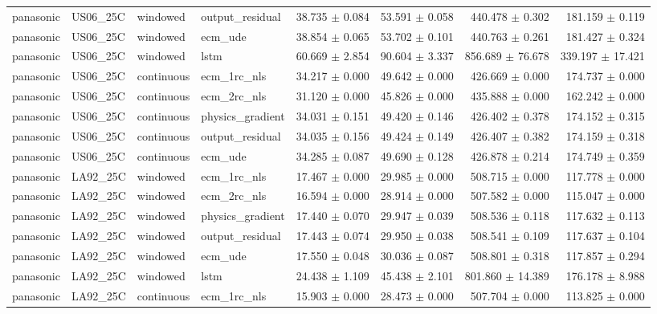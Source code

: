\begin{longtable}{llllrrrr}
panasonic & US06\_25C & windowed & output\_residual & 38.735 $\pm$ 0.084 & 53.591 $\pm$ 0.058 & 440.478 $\pm$ 0.302 & 181.159 $\pm$ 0.119 \\
panasonic & US06\_25C & windowed & ecm\_ude & 38.854 $\pm$ 0.065 & 53.702 $\pm$ 0.101 & 440.763 $\pm$ 0.261 & 181.427 $\pm$ 0.324 \\
panasonic & US06\_25C & windowed & lstm & 60.669 $\pm$ 2.854 & 90.604 $\pm$ 3.337 & 856.689 $\pm$ 76.678 & 339.197 $\pm$ 17.421 \\
panasonic & US06\_25C & continuous & ecm\_1rc\_nls & 34.217 $\pm$ 0.000 & 49.642 $\pm$ 0.000 & 426.669 $\pm$ 0.000 & 174.737 $\pm$ 0.000 \\
panasonic & US06\_25C & continuous & ecm\_2rc\_nls & 31.120 $\pm$ 0.000 & 45.826 $\pm$ 0.000 & 435.888 $\pm$ 0.000 & 162.242 $\pm$ 0.000 \\
panasonic & US06\_25C & continuous & physics\_gradient & 34.031 $\pm$ 0.151 & 49.420 $\pm$ 0.146 & 426.402 $\pm$ 0.378 & 174.152 $\pm$ 0.315 \\
panasonic & US06\_25C & continuous & output\_residual & 34.035 $\pm$ 0.156 & 49.424 $\pm$ 0.149 & 426.407 $\pm$ 0.382 & 174.159 $\pm$ 0.318 \\
panasonic & US06\_25C & continuous & ecm\_ude & 34.285 $\pm$ 0.087 & 49.690 $\pm$ 0.128 & 426.878 $\pm$ 0.214 & 174.749 $\pm$ 0.359 \\
panasonic & LA92\_25C & windowed & ecm\_1rc\_nls & 17.467 $\pm$ 0.000 & 29.985 $\pm$ 0.000 & 508.715 $\pm$ 0.000 & 117.778 $\pm$ 0.000 \\
panasonic & LA92\_25C & windowed & ecm\_2rc\_nls & 16.594 $\pm$ 0.000 & 28.914 $\pm$ 0.000 & 507.582 $\pm$ 0.000 & 115.047 $\pm$ 0.000 \\
panasonic & LA92\_25C & windowed & physics\_gradient & 17.440 $\pm$ 0.070 & 29.947 $\pm$ 0.039 & 508.536 $\pm$ 0.118 & 117.632 $\pm$ 0.113 \\
panasonic & LA92\_25C & windowed & output\_residual & 17.443 $\pm$ 0.074 & 29.950 $\pm$ 0.038 & 508.541 $\pm$ 0.109 & 117.637 $\pm$ 0.104 \\
panasonic & LA92\_25C & windowed & ecm\_ude & 17.550 $\pm$ 0.048 & 30.036 $\pm$ 0.087 & 508.801 $\pm$ 0.318 & 117.857 $\pm$ 0.294 \\
panasonic & LA92\_25C & windowed & lstm & 24.438 $\pm$ 1.109 & 45.438 $\pm$ 2.101 & 801.860 $\pm$ 14.389 & 176.178 $\pm$ 8.988 \\
panasonic & LA92\_25C & continuous & ecm\_1rc\_nls & 15.903 $\pm$ 0.000 & 28.473 $\pm$ 0.000 & 507.704 $\pm$ 0.000 & 113.825 $\pm$ 0.000 \\

\end{longtable}
